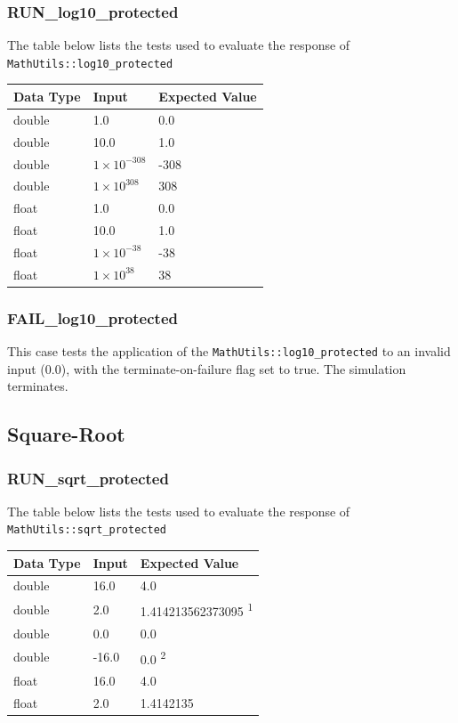 \documentclass[11pt,fleqn]{report}
\begin{document}
\subsubsection{RUN\_log10\_protected}
The table below lists the tests used to evaluate the response of
\texttt{MathUtils::log10\_protected}
\begin{center}
\begin{tabular}{|l||l|l|}
\hline
 \textbf{Data Type} & \textbf{Input} & \textbf{Expected Value} \\
\hline \hline
double &1.0 & 0.0 \\
double & 10.0 & 1.0 \\
double & $1 \times 10^{-308}$ & -308 \\
double & $1 \times 10^{308}$&308 \\
\hline
float&1.0 & 0.0 \\
float& 10.0 & 1.0 \\
float& $1 \times 10^{-38}$& -38 \\
float& $1 \times 10^{38}$ &38 \\
\hline \hline
\end{tabular}
\end{center}

\subsubsection{FAIL\_log10\_protected}
This case tests the application of the \texttt{MathUtils::log10\_protected}
to an invalid input
(0.0), with the terminate-on-failure flag set to true. The simulation
terminates.

\subsection{Square-Root}
\subsubsection{RUN\_sqrt\_protected}
The table below lists the tests used to evaluate the response of
\texttt{MathUtils::sqrt\_protected}
\begin{center}
\begin{tabular}{|l||l|l|}
\hline
 \textbf{Data Type} & \textbf{Input} & \textbf{Expected Value} \\
\hline \hline
double &16.0& 4.0 \\
double & 2.0& 1.414213562373095 \textsuperscript{1} \\
double & 0.0& 0.0 \\
double & -16.0& 0.0 \textsuperscript{2} \\
\hline
float&16.0& 4.0 \\
float& 2.0& 1.4142135 \\
\hline \hline
\end{tabular}
\end{center}
\end{document}
